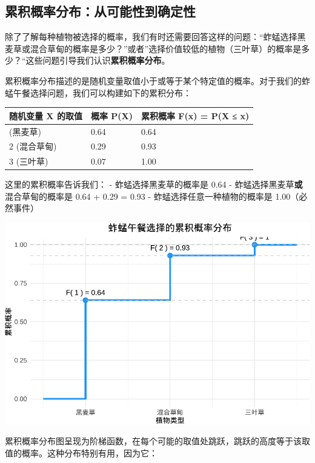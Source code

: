 \documentclass[
]{book}
\begin{document}
\hypertarget{ux7d2fux79efux6982ux7387ux5206ux5e03ux4eceux53efux80fdux6027ux5230ux786eux5b9aux6027}{%
\subsection{累积概率分布：从可能性到确定性}\label{ux7d2fux79efux6982ux7387ux5206ux5e03ux4eceux53efux80fdux6027ux5230ux786eux5b9aux6027}}

除了了解每种植物被选择的概率，我们有时还需要回答这样的问题：``蚱蜢选择黑麦草或混合草甸的概率是多少？''或者''选择价值较低的植物（三叶草）的概率是多少？``这些问题引导我们认识\textbf{累积概率分布}。

累积概率分布描述的是随机变量取值小于或等于某个特定值的概率。对于我们的蚱蜢午餐选择问题，我们可以构建如下的累积分布：

\begin{longtable}[]{@{}lll@{}}
\toprule\noalign{}
随机变量 X 的取值 & 概率 P(X) & 累积概率 F(x) = P(X ≤ x) \\
\midrule\noalign{}
\endhead
\bottomrule\noalign{}
\endlastfoot
1 (黑麦草) & 0.64 & 0.64 \\
2 (混合草甸) & 0.29 & 0.93 \\
3 (三叶草) & 0.07 & 1.00 \\
\end{longtable}

这里的累积概率告诉我们：
- 蚱蜢选择黑麦草的概率是 0.64
- 蚱蜢选择黑麦草\textbf{或}混合草甸的概率是 0.64 + 0.29 = 0.93
- 蚱蜢选择任意一种植物的概率是 1.00（必然事件）

\begin{center}\includegraphics[width=0.8\linewidth]{ecological-statistics_files/figure-latex/unnamed-chunk-18-1} \end{center}

累积概率分布图呈现为阶梯函数，在每个可能的取值处跳跃，跳跃的高度等于该取值的概率。这种分布特别有用，因为它：
\end{document}
